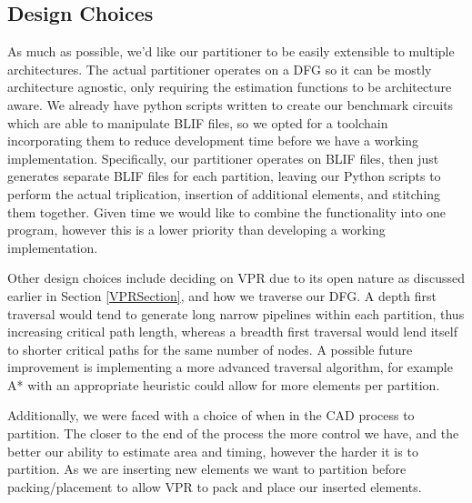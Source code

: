 \documentclass[12pt,drafta4paper,oneside]{memoir} %
\begin{document}
\subsection{Design Choices}
As much as possible, we'd like our partitioner to be easily extensible to multiple architectures. The actual partitioner operates on a \ac{DFG} so it can be mostly architecture agnostic, only requiring the estimation functions to be architecture aware.
We already have python scripts written to create our benchmark circuits which are able to manipulate \ac{BLIF} files, so we opted for a toolchain incorporating them to reduce development time before we have a working implementation. Specifically, our partitioner operates on \ac{BLIF} files, then just generates separate \ac{BLIF} files for each partition, leaving our Python scripts to perform the actual triplication, insertion of additional elements, and stitching them together. Given time we would like to combine the functionality into one program, however this is a lower priority than developing a working implementation.

Other design choices include deciding on \ac{VPR} due to its open nature as discussed earlier in Section \ref{VPRSection}, and how we traverse our \ac{DFG}. A depth first traversal would tend to generate long narrow pipelines within each partition, thus increasing critical path length, whereas a breadth first traversal would lend itself to shorter critical paths for the same number of nodes. A possible future improvement is implementing a more advanced traversal algorithm, for example A* with an appropriate heuristic could allow for more elements per partition.

Additionally, we were faced with a choice of when in the \ac{CAD} process to partition. The closer to the end of the process the more control we have, and the better our ability to estimate area and timing, however the harder it is to partition. As we are inserting new elements we want to partition before packing/placement to allow \ac{VPR} to pack and place our inserted elements.
\end{document}
